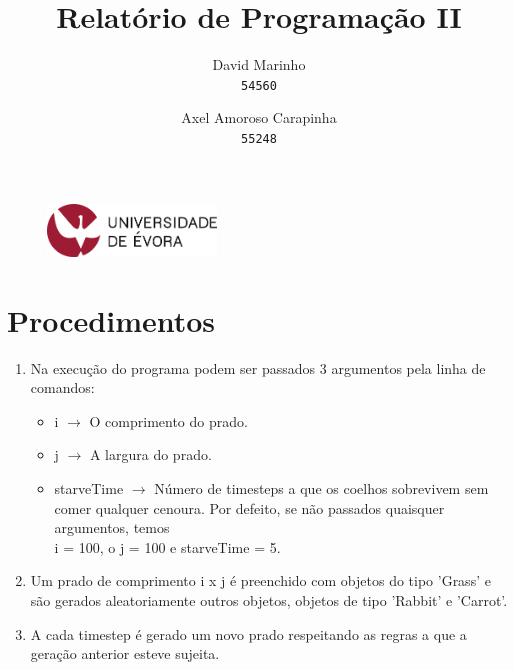 \documentclass {report}
\title {Relatório de Programação II}
\author{
  David Marinho\\
  \texttt{54560}
  \and
  Axel Amoroso Carapinha\\
  \texttt{55248}
}
\begin{document}
\date{}
\begin{figure}[t]
	\vspace {-2cm}
	\centering
	\includegraphics[width=0.4\textwidth]{uni_logo.png}
\end{figure}
\maketitle

\section* {Procedimentos}
\begin{enumerate}
  \item Na execução do programa podem ser passados 3 argumentos pela linha de comandos:
		\begin{itemize}
			\item i \(\rightarrow\) O comprimento do prado.
			\item j \(\rightarrow\) A largura do prado. 
			\item starveTime \(\rightarrow\) Número de timesteps a que os coelhos 
					  sobrevivem sem comer qualquer cenoura. Por defeito, se não passados 
						quaisquer argumentos, temos \\i = 100, o j = 100 e starveTime = 5.
		\end{itemize}
	\item Um prado de comprimento i x j é preenchido com objetos do tipo 'Grass'
				e são gerados aleatoriamente outros objetos, objetos de tipo 'Rabbit' e 
				'Carrot'.
	\item A cada timestep é gerado um novo prado respeitando as regras a que
				a geração anterior esteve sujeita.
\end{enumerate}
\end{document}
